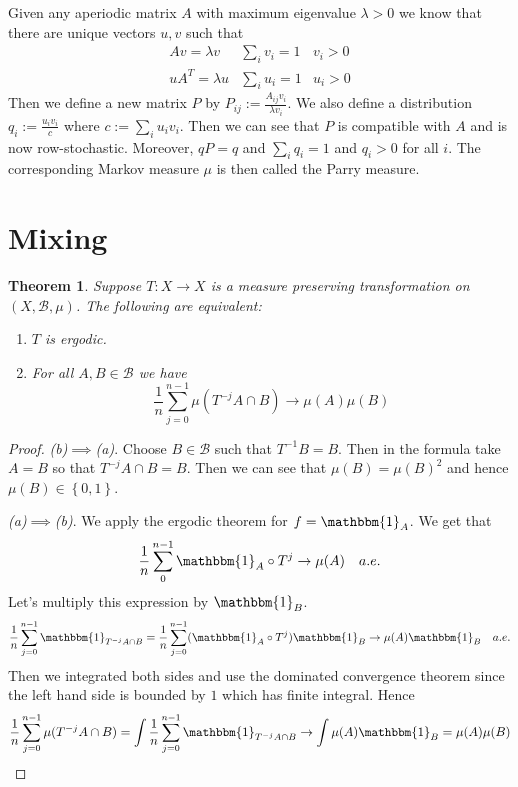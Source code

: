 \documentclass[11pt]{article}
\newcommand{\defeq}{:=}
\newcommand{\indic}[1]{\mathbbm{1}_{#1}}
\newcommand{\mdf}[1]{{\color{red} #1}}
\newtheorem{theorem}[prop]{Theorem}
\begin{document}
Given any aperiodic matrix $A$ with maximum eigenvalue $\lambda>0$ we know that there are unique vectors $u, v$ such that
\begin{align*}
	Av = \lambda v &\sum_{i}v_i=1 & v_i > 0 \\
	uA^T = \lambda u & \sum_{i}u_i =1 & u_i >0
\end{align*}
Then we define a new matrix $P$ by $P_{ij}\defeq\frac{A_{ij} v_i}{\lambda v_i}$.
We also define a distribution $q_i\defeq\frac{u_i v_i}{c}$ where $c\defeq \sum_{i}u_i v_i$.
Then we can see that $P$ is compatible with $A$ and is now row-stochastic.
Moreover, $qP=q$ and $\sum_{i}q_i = 1$ and $q_i>0$ for all $i$.
The corresponding Markov measure $\mu$ is then called the \mdf{Parry measure}.

\section{Mixing}
\begin{theorem}
Suppose $T:X \to X$ is a measure preserving transformation on $(X,\mathcal{B}, \mu)$.
The following are equivalent:
\begin{enumerate}[label=(\alph*)]
	\item $T$ is ergodic.
	\item For all $A,B\in\mathcal{B}$ we have
		\[
			\frac{1}{n}\sum_{j=0}^{n-1}\mu(T^{-j}A\cap B) \to \mu(A)\mu(B)
		\]
\end{enumerate}
\end{theorem}

\begin{proof}
\textit{(b)}$\implies$\textit{(a)}.
Choose $B\in\mathcal{B}$ such that $T^{-1}B=B$.
Then in the formula take $A=B$ so that $T^{-j}A\cap B=B$.
Then we can see that $\mu(B)=\mu(B)^2$ and hence $\mu(B)\in\left\{ 0, 1\right\}$.

\textit{(a)}$\implies$\textit{(b)}.
We apply the ergodic theorem for $f=\indic{A}$.
We get that
\[
	\frac{1}{n}\sum_{0}^{n-1}\indic{A}\circ T^j \to \mu(A) \quad a.e.
\]
Let's multiply this expression by $\indic{B}$.
\[
	\frac{1}{n}\sum_{j=0}^{n-1}\indic{T^{-j}A\cap B} = \frac{1}{n}\sum_{j=0}^{n-1}(\indic{A}\circ T^j)\indic{B} \to \mu(A)\indic{B}\quad a.e.
\]
Then we integrated both sides and use the dominated convergence theorem since the left hand side is bounded by $1$ which has finite integral.
Hence
\[
	\frac{1}{n}\sum_{j=0}^{n-1}\mu(T^{-j}A\cap B) = \int \frac{1}{n}\sum_{j=0}^{n-1}\indic{T^{-j}A\cap B} \to \int \mu(A) \indic{B} = \mu(A) \mu(B)
\]
\end{proof}
\end{document}

